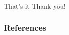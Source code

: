 \documentclass{beamer}
\begin{document}
\begin{frame}{That's it}
\center
\fontsize{18pt}{7.2}\selectfont
Thank you!
\end{frame}

\begin{frame}[allowframebreaks]
\frametitle{References}


\end{frame}
\end{document}

